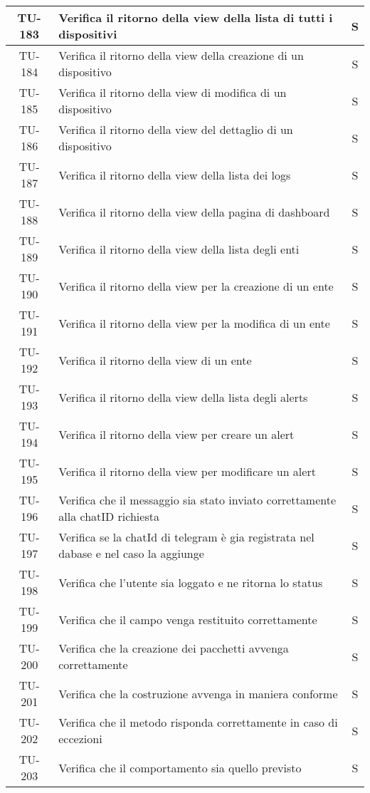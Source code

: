 \begin{center}
\begin{longtable}{|c|p{12cm}|c|}
			\hline
			TU-183 & Verifica il ritorno della view della lista di tutti i dispositivi & S \\
			\hline
			TU-184 & Verifica il ritorno della view della creazione di un dispositivo & S \\
			\hline
			TU-185 & Verifica il ritorno della view di modifica di un dispositivo & S \\
			\hline
			TU-186 & Verifica il ritorno della view del dettaglio di un dispositivo & S \\
			\hline
			TU-187 & Verifica il ritorno della view della lista dei logs & S \\
			\hline
			TU-188 & Verifica il ritorno della view della pagina di dashboard & S \\
			\hline
			TU-189 & Verifica il ritorno della view della lista degli enti & S \\
			\hline
			TU-190 & Verifica il ritorno della view per la creazione di un ente & S \\
			\hline
			TU-191 & Verifica il ritorno della view per la modifica di un ente & S \\
			\hline
			TU-192 & Verifica il ritorno della view di un ente & S \\
			\hline
			TU-193 & Verifica il ritorno della view della lista degli alerts & S \\
			\hline
			TU-194 & Verifica il ritorno della view per creare un alert & S \\
			\hline
			TU-195 & Verifica il ritorno della view per modificare un alert & S \\
			\hline
			TU-196 & Verifica che il messaggio sia stato inviato correttamente alla chatID richiesta & S \\
			\hline
			TU-197 & Verifica se la chatId di telegram è gia registrata nel dabase e nel caso la aggiunge & S \\
			\hline
			TU-198 & Verifica che l'utente sia loggato e ne ritorna lo status & S \\
			\hline
			TU-199 & Verifica che il campo venga restituito correttamente & S \\
			\hline
			TU-200 & Verifica che la creazione dei pacchetti avvenga correttamente & S \\
			\hline
			TU-201 & Verifica che la costruzione avvenga in maniera conforme & S \\
			\hline
			TU-202 & Verifica che il metodo risponda correttamente in caso di eccezioni & S \\
			\hline
			TU-203 & Verifica che il comportamento sia quello previsto & S \\

\end{longtable}
\end{center}
